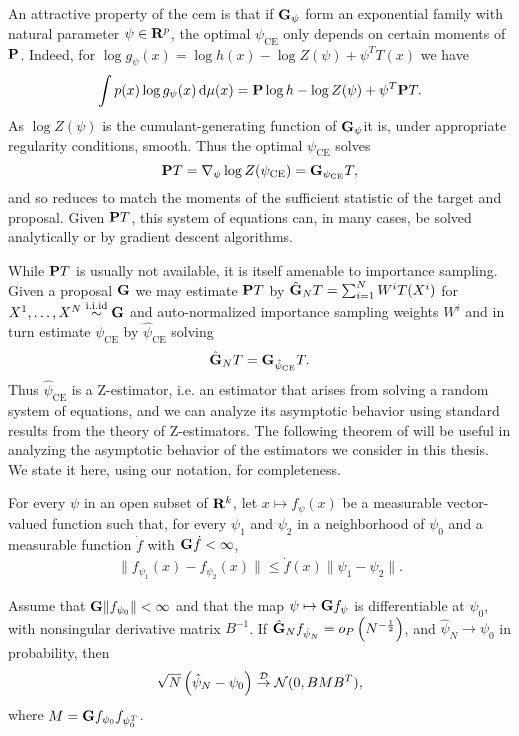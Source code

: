 An attractive property of the \gls{cem} is that if $\G_{\psi}$ form an exponential family with natural parameter $\psi \in \R^{p}$, the optimal $\psi_{\text{CE}}$ only depends on certain moments of $\P$. Indeed, for $\log g_{\psi}(x) = \log h(x) - \log Z(\psi) + \psi^{T} T(x)$ we have 
$$
\int p(x) \log g_{\psi}(x) \d \mu(x) = \P \log h - \log Z(\psi) + \psi^{T} \P T.
$$
 As $\log Z(\psi)$ is the cumulant-generating function of $\G_{\psi}$it is, under appropriate regularity conditions, smooth. Thus the optimal $\psi_{\text{CE}}$ solves
$$
\P T = \nabla_{\psi} \log Z(\pce) = \G_{\pce}T,
$$
and so reduces to match the moments of the sufficient statistic of the target and proposal.
Given $\P T$, this system of equations can, in many cases, be solved analytically or by gradient descent algorithms.

While $\P T$ is usually not available, it is itself amenable to importance sampling. Given a proposal $\G$ we may estimate $\P T$ by $\hat\G_N T = \sum_{i = 1}^{N} W^{i} T(X^{i})$ for $X^{1}, \dots, X^{N} \iid \G$ and auto-normalized importance sampling weights $W^{i}$ and in turn estimate $\psi_{\text{CE}}$ by $\hat \psi_{\text{CE}}$ solving
$$
\hat \G_N T = \G_{\hpce} T.
$$
Thus $\hat\psi_{\text{CE}}$ is a Z-estimator, i.e. an estimator that arises from solving a random system of equations, and we can analyze its asymptotic behavior using standard results from the theory of Z-estimators. 
The following theorem of \citep{VanderVaart2000Asymptotic} will be useful in analyzing the asymptotic behavior of the estimators we consider in this thesis. We state it here, using our notation, for completeness.

\begin{theorem}
    \label{thm:clt_z_est_vdv}
    For every $\psi$ in an open subset of $\R^{k}$, let $x \mapsto f_{\psi}(x)$ be a measurable vector-valued function such that, for every $\psi_{1}$ and $\psi_{2}$ in a neighborhood of $\psi_{0}$ and a measurable function $\dot f$ with $\G \dot f < \infty$,
    \begin{align}
    \label{eq:clt-vdv-local-lipschitz}
    \lVert f_{\psi_{1}}(x) - f_{\psi_{2}}(x)\rVert \leq \dot f(x) \lVert \psi_{1} - \psi_{2}\rVert \tag{LL}.
    \end{align}

    Assume that $\G \lVert f_{\psi_{0}}\rVert < \infty$ and that the map $\psi \mapsto \G f_{\psi}$ is differentiable at $\psi_{0}$, with nonsingular derivative matrix $B^{-1}$. If $\hat\G_{N} f_{\hat\psi_{N}} = o_{P} \left( N^{-\frac{1}{2}} \right)$, and $\hat\psi_{N} \to \psi_{0}$ in probability, then
    \begin{align}
        \label{eq:clt-vdv}
        \sqrt{N} \left( \hat\psi_{N} - \psi_{0} \right) \Dto \mathcal N(0, BMB^{T}),
    \end{align}
    where $M = \G f_{\psi_{0}} f_{\psi_{0}^{T}}$.
\end{theorem}

